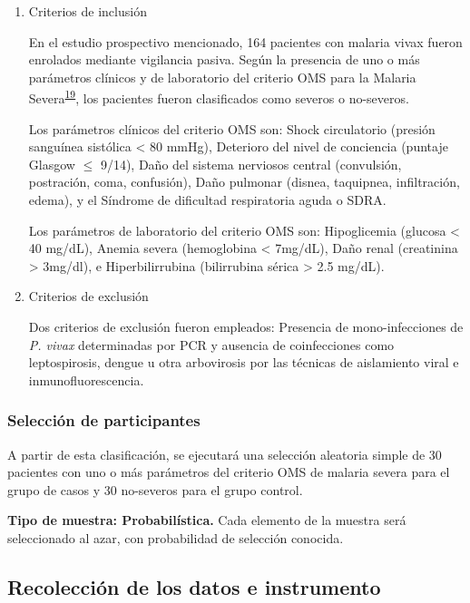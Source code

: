 \documentclass[]{article}
\begin{document}
\begin{enumerate}
\def\labelenumi{\alph{enumi}.}
\item
  Criterios de inclusión

  En el estudio prospectivo mencionado, 164 pacientes con malaria vivax
  fueron enrolados mediante vigilancia pasiva. Según la presencia de uno
  o más parámetros clínicos y de laboratorio del criterio OMS para la
  Malaria
  Severa\textsuperscript{\protect\hyperlink{ref-WHO2014severe}{19}}, los
  pacientes fueron clasificados como severos o no-severos.

  Los parámetros clínicos del criterio OMS son: Shock circulatorio
  (presión sanguínea sistólica \textless{} 80 mmHg), Deterioro del nivel
  de conciencia (puntaje Glasgow \(\le\) 9/14), Daño del sistema
  nerviosos central (convulsión, postración, coma, confusión), Daño
  pulmonar (disnea, taquipnea, infiltración, edema), y el Síndrome de
  dificultad respiratoria aguda o SDRA.

  Los parámetros de laboratorio del criterio OMS son: Hipoglicemia
  (glucosa \textless{} 40 mg/dL), Anemia severa (hemoglobina \textless{}
  7mg/dL), Daño renal (creatinina \textgreater{} 3mg/dl), e
  Hiperbilirrubina (bilirrubina sérica \textgreater{} 2.5 mg/dL). 
\item
  Criterios de exclusión

  Dos criterios de exclusión fueron empleados: Presencia de
  mono-infecciones de \emph{P. vivax} determinadas por PCR y ausencia de
  coinfecciones como leptospirosis, dengue u otra arbovirosis por las
  técnicas de aislamiento viral e inmunofluorescencia.
\end{enumerate}

\subsubsection{Selección de
participantes}\label{seleccion-de-participantes}

A partir de esta clasificación, se ejecutará una selección aleatoria
simple de 30 pacientes con uno o más parámetros del criterio OMS de
malaria severa para el grupo de casos y 30 no-severos para el grupo
control.

\textbf{Tipo de muestra: Probabilística.} Cada elemento de la muestra
será seleccionado al azar, con probabilidad de selección conocida.

\subsection{Recolección de los datos e
instrumento}\label{recoleccion-de-los-datos-e-instrumento}
\end{document}
